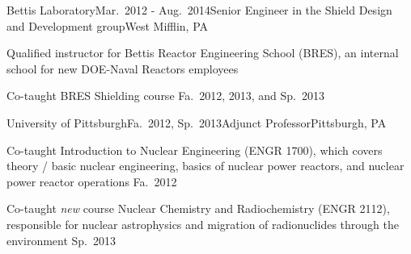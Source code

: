 
\begin{rSubsection}{Bettis Laboratory}{Mar.\ 2012 - Aug.\ 2014}{Senior Engineer in the Shield Design and Development group}{West Mifflin, PA}
\item Qualified instructor for Bettis Reactor Engineering School (BRES), an internal school for new DOE-Naval Reactors employees
\item Co-taught BRES Shielding course Fa.\ 2012, 2013, and Sp.\ 2013
\end{rSubsection}

\clearpage
\begin{rSubsection}{University of Pittsburgh}{Fa.\ 2012, Sp.\ 2013}{Adjunct Professor}{Pittsburgh, PA}
\item Co-taught Introduction to Nuclear Engineering (ENGR 1700), which covers theory / basic nuclear engineering, basics of nuclear power reactors, and nuclear power reactor operations Fa.\ 2012
\item Co-taught \textit{new} course Nuclear Chemistry and Radiochemistry (ENGR 2112), responsible for nuclear astrophysics and migration of radionuclides through the environment Sp.\ 2013
\end{rSubsection}



%
